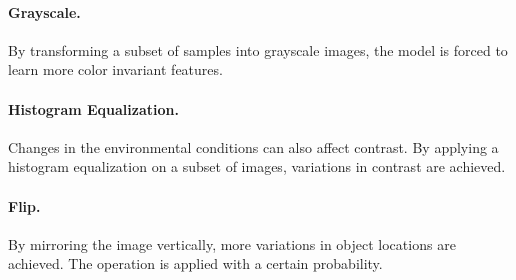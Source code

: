 \paragraph{Grayscale.} By transforming a subset of samples into grayscale images, the model is forced to learn more color invariant features. 
	
\paragraph{Histogram Equalization.} Changes in the environmental conditions can also affect contrast. By applying a histogram equalization on a subset of images, variations in contrast are achieved. 
	
\paragraph{Flip.} By mirroring the image vertically, more variations in object locations are achieved. The operation is applied with a certain probability.



